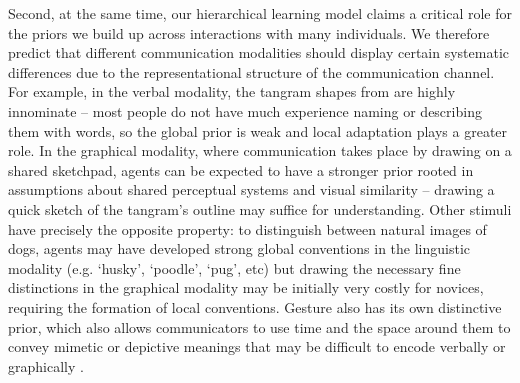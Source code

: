Second, at the same time, our hierarchical learning model claims a critical role for the priors we build up across interactions with many individuals.
We therefore predict that different communication modalities should display certain systematic differences due to the representational structure of the communication channel.
For example, in the verbal modality, the tangram shapes from  are highly innominate -- most people do not have much experience naming or describing them with words, so the global prior is weak and local adaptation plays a greater role.
In the graphical modality, where communication takes place by drawing on a shared sketchpad, agents can be expected to have a stronger prior rooted in assumptions about shared perceptual systems and visual similarity \cite{fan2018common} -- drawing a quick sketch of the tangram's outline may suffice for understanding.
Other stimuli have precisely the opposite property: to distinguish between natural images of dogs, agents may have developed strong global conventions in the linguistic modality (e.g. `husky', `poodle', `pug', etc) but drawing the necessary fine distinctions in the graphical modality may be initially very costly for novices, requiring the formation of local conventions. 
Gesture also has its own distinctive prior, which also allows communicators to use time and the space around them to convey mimetic or depictive meanings that may be difficult to encode verbally or graphically \cite{goldin-meadow_role_1999,clark2016depicting,mcneill1992hand}. 


